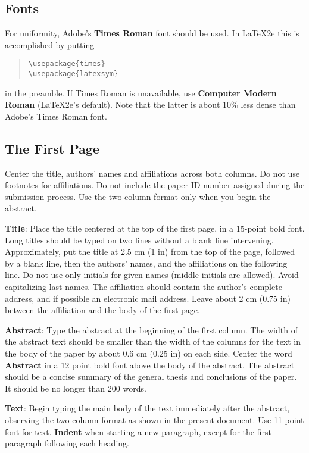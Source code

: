 \documentclass[11pt]{article}
\begin{document}
\subsection{Fonts}

For uniformity, Adobe's {\bf Times Roman} font should be
used. In \LaTeX2e{} this is accomplished by putting

\begin{quote}
\begin{verbatim}
\usepackage{times}
\usepackage{latexsym}
\end{verbatim}
\end{quote}
in the preamble. If Times Roman is unavailable, use {\bf Computer
  Modern Roman} (\LaTeX2e{}'s default).  Note that the latter is about
  10\% less dense than Adobe's Times Roman font.


\subsection{The First Page}
\label{ssec:first}

Center the title, authors' names and affiliations across both
columns. Do not use footnotes for affiliations. Do not include the
paper ID number assigned during the submission process. Use the
two-column format only when you begin the abstract.

{\bf Title}: Place the title centered at the top of the first page, in
a 15-point bold font. Long titles should be typed on two lines without
a blank line intervening. Approximately, put the title at 2.5 cm (1 in) from
the top of the page, followed by a blank line, then the authors'
names, and the affiliations on the following line. Do not use only
initials for given names (middle initials are allowed). Avoid
capitalizing last names. The affiliation should contain the author's
complete address, and if possible an electronic mail address. Leave
about 2 cm (0.75 in) between the affiliation and the body of the first page.

{\bf Abstract}: Type the abstract at the beginning of the first
column. The width of the abstract text should be smaller than the
width of the columns for the text in the body of the paper by about
0.6 cm (0.25 in) on each side. Center the word {\bf Abstract} in a 12 point bold
font above the body of the abstract. The abstract should be a concise
summary of the general thesis and conclusions of the paper. It should
be no longer than 200 words.

{\bf Text}: Begin typing the main body of the text immediately after the
abstract, observing the two-column format as shown in the present document.
Use 11 point font for text. {\bf Indent} when starting a new paragraph, except
for the first paragraph following each heading.
\end{document}
